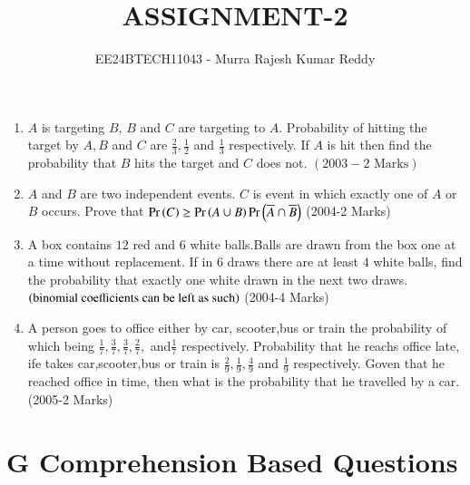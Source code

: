 \documentclass[journal,12pt,onecolumn,article]{IEEEtran}
\theoremstyle{remark}
\begin{document}

\vspace{3cm}
\title{ASSIGNMENT-2}
\author{EE24BTECH11043 - Murra Rajesh Kumar Reddy}
\maketitle
\bigskip
\begin{enumerate}
	\item $A$ is targeting $B$, $B$ and $C$ are targeting to $A$. Probability of hitting the target by $A, B$ and $C$ are $\frac{2}{3},\frac{1}{2}$ and $\frac{1}{3}$ respectively. If $A$ is hit then find the probability that $B$ hits the target and $C$ does not. \hfill${(2003-2 \text{ Marks})}$
	\item $A$ and $B$ are two independent events. $C$ is event in which exactly one of $A$ or $B$ occurs. Prove that $\Pr\left(C\right)\ge \Pr\left(A\cup B\right)\Pr\left(\overline{A}\cap\overline{B}\right)$ \hfill(2004-2 Marks)
	\item A box contains $12$ red and $6$ white balls.Balls are drawn from the box one at a time without replacement. If in 6 draws there are at least $4$ white balls, find the probability that exactly one white drawn in the next two draws. $\left(\text{binomial coefficients can be left as such}\right)$ \hfill{(2004-4 Marks)}
\item A person goes to office either by car, scooter,bus or train the probability of which being $\frac{1}{7},\frac{3}{7},\frac{3}{7},\frac{2}{7},$ and$\frac{1}{7}$ respectively. Probability that he reachs office late, ife takes car,scooter,bus or train is $\frac{2}{9},\frac{1}{9},\frac{4}{9}$ and $\frac{1}{9}$ respectively. Goven that he reached office in time, then what is the probability that he travelled by a car. \hfill(2005-2 Marks)
\end{enumerate}
\section*{G Comprehension Based Questions}
\end{document}
